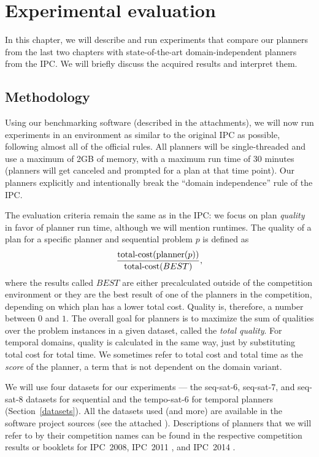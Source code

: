 \chapter{Experimental evaluation}\label{experiments}

In this chapter, we will describe and run experiments
that compare our planners from the last two chapters
with state-of-the-art domain-independent planners from the IPC.
We will briefly discuss the acquired results and interpret them.

\section{Methodology}

Using our benchmarking software (described in the attachments), we will now run experiments in an
environment as similar to the original
IPC as possible, following almost all of the official rules.
All planners will be single-threaded and use a maximum of 2GB of memory, with a maximum run time of 30 minutes (planners will
get canceled and prompted for a plan at that time point).
Our planners explicitly and intentionally break the ``domain independence'' rule of the IPC.

The evaluation criteria remain the same as in the IPC:
we focus on plan \textit{quality} in favor of planner run time,
although we will mention runtimes.
The quality of a plan for a specific planner and sequential problem $p$ is defined as
$$\frac{\textrm{total-cost}(\textrm{planner}(p))}{\textrm{total-cost}(BEST)},$$
where the results called $BEST$
are either precalculated outside of the competition environment or they are the best result of one of the planners in the competition, depending on which plan has a lower total cost.
Quality is, therefore, a number between $0$ and $1$.
The overall goal for planners is to maximize the sum of qualities over the problem instances in a given dataset, called the \textit{total quality}.
For temporal domains, quality is calculated in the same way, just by substituting total cost
for total time. We sometimes refer to total cost and total time as the \textit{score} of the planner, a term that is not dependent on the domain variant.

We will use four datasets for our experiments --- the seq-sat-6, seq-sat-7,
and seq-sat-8 datasets for sequential
and the tempo-sat-6 for temporal planners (Section~\ref{datasets}).
All the datasets used (and more) are available in the
software project sources (see the attached ).
Descriptions of planners that we will refer to by their competition names can be found in the respective competition results or booklets for IPC~2008, IPC~2011 \citep{Garcia-Olaya2011}, and IPC~2014 \citep{Vallati2015}.

